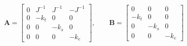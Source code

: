         \begin{equation}
                \bm{A} =
                \begin{bmatrix}
                        0 & J^{-1}& J^{-1}& -J^{-1}\\
                        0 & -k_t & 0 & 0\\
                        0 & 0 & -k_s & 0\\
                        0 & 0 & 0 & -k_e
                \end{bmatrix}
                , \qquad \bm{B} =
                \begin{bmatrix}
                        0 & 0 & 0 \\
                        -k_t & 0 & 0\\
                        0 & -k_s & 0\\
                        0 & 0 & -k_e
                \end{bmatrix}
        \end{equation}



